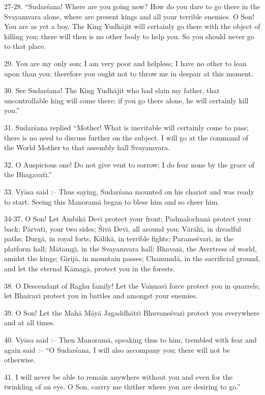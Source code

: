 27-28. ``Sudar\'sana! Where are you going now? How do you dare to go there in the Svayamvara alone, where are present kings and all your terrible enemies. O Son! You are as yet a boy. The King Yudh\=ajit will certainly go there with the object of killing you; there will then is no other body to help you. So you should never go to that place.

29. You are my only son; I am very poor and helpless; I have no other to lean upon than you; therefore you ought not to throw me in despair at this moment.

30. See Sudar\'sana! The King Yudh\=ajit who had slain my father, that uncontrollable king will come there; if you go there alone, he will certainly kill you.''

31. Sudar\'sana replied ``Mother! What is inevitable will certainly come to pass; there is no need to discuss further on the subject. I will go at the command of the World Mother to that assembly hall
Svayamvara.

32. O Auspicious one! Do not give vent to sorrow; I do fear none by the grace of the Bhagavat\={\i}.''

33. Vy\=asa said :-- Thus saying, Sudar\'sana mounted on his chariot and was ready to start. Seeing this Manoram\=a began to bless him and so cheer him.

34-37. O Son! Let Ambik\=a Dev\={\i} protect your front; Padmalochan\=a protect your back; P\=arvat\={\i}, your two sides; \'Siv\=a Dev\={\i}, all around you; V\=ar\=ah\={\i}, in dreadful paths; Durg\=a, in royal forts, K\=alik\=a, in terrible fights; Parame\'svar\={\i}, in the platform hall; M\=atamg\={\i}, in the Svayamvara hall; Bhavan\={\i}, the Avertress of world, amidst the kings; Girij\=a, in mountain passes; Chamund\=a, in the sacrificial ground, and let the eternal K\=amag\=a, protect you in the forests.

38. O Descendant of Raghu family! Let the Vai\d{s}nav\={\i} force protect you in quarrels; let Bhairav\={\i} protect you in battles and amongst your enemies.

39. O Son! Let the Mah\=a M\=ay\=a Jagaddh\=atr\={\i} Bhuvane\'svar\={\i} protect you everywhere and at all times.

40. Vy\=asa said :-- Then Manoram\=a, speaking thus to him, trembled with fear and again said :-- ``O Sudar\'sana, I will also accompany you; there will not be otherwise.

41. I will never be able to remain anywhere without you and even for the twinkling of an eye. O Son, carrry me thither where you are desiring to go.''

